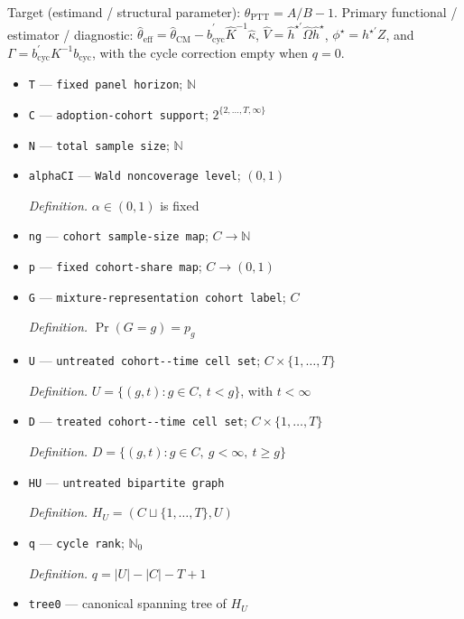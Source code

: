 \documentclass{article}
\begin{document}
Target (estimand / structural parameter): \(\theta_{\mathrm{PTT}}=A/B-1\).
Primary functional / estimator / diagnostic: \(\widehat\theta_{\mathrm{eff}}=\widehat\theta_{\mathrm{CM}}-\widehat b_{\mathrm{cyc}}^{\prime}\widehat K^{-1}\widehat\kappa\), \(\widehat V=\widehat h^{\star\prime}\widehat\Omega\widehat h^{\star}\), \(\phi^{\star}=h^{\star\prime}Z\), and \(\Gamma=b_{\mathrm{cyc}}^{\prime}K^{-1}b_{\mathrm{cyc}}\), with the cycle correction empty when \(q=0\).
\begin{itemize}
  \item \texttt{T} --- \texttt{fixed panel horizon}; \(\mathbb N\)
  \item \texttt{C} --- \texttt{adoption-\allowbreak{}cohort support}; \(2^{\{2,\ldots,T,\infty\}}\)
  \item \texttt{N} --- \texttt{total sample size}; \(\mathbb N\)
  \item \texttt{alphaCI} --- \texttt{Wald noncoverage level}; \((0,1)\)
  \par\smallskip\noindent\emph{Definition.} \(\alpha\in(0,1)\) is fixed
  \item \texttt{ng} --- \texttt{cohort sample-\allowbreak{}size map}; \(C\to\mathbb N\)
  \item \texttt{p} --- \texttt{fixed cohort-\allowbreak{}share map}; \(C\to(0,1)\)
  \item \texttt{G} --- \texttt{mixture-\allowbreak{}representation cohort label}; \(C\)
  \par\smallskip\noindent\emph{Definition.} \(\Pr(G=g)=p_g\)
  \item \texttt{U} --- \texttt{untreated cohort-\allowbreak{}-\allowbreak{}time cell set}; \(C\times\{1,\ldots,T\}\)
  \par\smallskip\noindent\emph{Definition.} \(U=\{(g,t):g\in C,\ t<g\}\), with \(t<\infty\)
  \item \texttt{D} --- \texttt{treated cohort-\allowbreak{}-\allowbreak{}time cell set}; \(C\times\{1,\ldots,T\}\)
  \par\smallskip\noindent\emph{Definition.} \(D=\{(g,t):g\in C,\ g<\infty,\ t\ge g\}\)
  \item \texttt{HU} --- \texttt{untreated bipartite graph}
  \par\smallskip\noindent\emph{Definition.} \(H_U=(C\sqcup\{1,\ldots,T\},U)\)
  \item \texttt{q} --- \texttt{cycle rank}; \(\mathbb N_0\)
  \par\smallskip\noindent\emph{Definition.} \(q=|U|-|C|-T+1\)
  \item \texttt{tree0} --- canonical spanning tree of \(H_U\)

\end{itemize}
\end{document}
